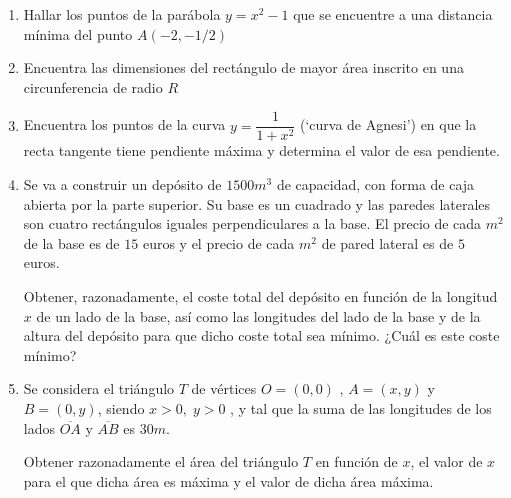 \begin{enumerate}
		\item Hallar los puntos de la parábola $y=x^2-1$ que se encuentre a una distancia mínima del punto $A(-2,-1/2)$
		
		\rightline{\textcolor{gris}{Solución: $m(-1,0)$}}
		
		\item Encuentra las dimensiones del rectángulo de mayor área inscrito en una circunferencia de radio $R$
		
		
		\item Encuentra los puntos de la curva $y=\dfrac {1}{1+x^2}$ (`curva de Agnesi') en que la recta tangente tiene pendiente máxima y determina el valor de esa pendiente.
		
		
		\item Se va a construir un depósito de $1500 m^3$ de capacidad, con forma de caja abierta por la parte superior. Su base es un cuadrado y las paredes laterales son cuatro rectángulos iguales perpendiculares a la base. El precio de cada $m^2$ de la base es de $15$ euros y el precio de cada $m^2$ de pared lateral es de $5$ euros.
		
	Obtener, razonadamente, el coste total del depósito en función de la longitud $x$ de un lado de la base, así como las longitudes del lado de la base y de la altura del depósito para que dicho coste total sea mínimo. ¿Cuál es este coste mínimo? 	
	
	
		
		
		
		
		
		\item  Se considera el triángulo $T$ de vértices $O = (0, 0)$ , $A = (x, y)$ y $B = (0, y)$, siendo $x>0,\;y>0$ , y tal que la suma de las longitudes de los lados $\overline{OA}$ y $\overline{AB}$ es $30m$.
		 
		Obtener razonadamente el área del triángulo $T$ en función de $x$, el valor de $x$ para el que dicha área es máxima y el valor de dicha área máxima.
		
		

\end{enumerate}
